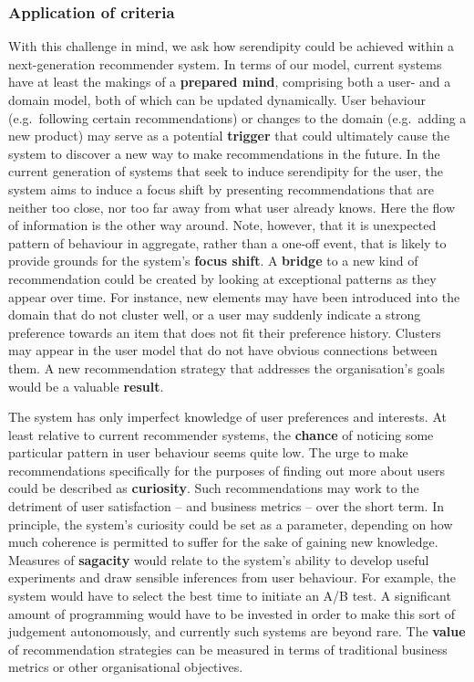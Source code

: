 \subsubsection{Application of criteria}

With this challenge in mind, we ask how serendipity could be achieved
within a next-generation recommender system. In terms of our model,
current systems have at least the makings of a \textbf{prepared mind},
comprising both a user- and a domain model, both of which can be
updated dynamically.  User behaviour (e.g.~following certain
recommendations) or changes to the domain (e.g.~adding a new product)
may serve as a potential \textbf{trigger} that could ultimately cause
the system to discover a new way to make recommendations in the
future.  In the current generation of systems that seek to induce
serendipity for the user, the system aims to induce a focus shift by
presenting recommendations that are neither too close, nor too far
away from what user already knows.  Here the flow of information is
the other way around.  Note, however, that it is unexpected pattern of
behaviour in aggregate, rather than a one-off event, that is likely to
provide grounds for the system's \textbf{focus shift}.  A
\textbf{bridge} to a new kind of recommendation could be created by
looking at exceptional patterns as they appear over time.  For
instance, new elements may have been introduced into the domain that
do not cluster well, or a user may suddenly indicate a strong
preference towards an item that does not fit their preference history.
Clusters may appear in the user model that do not have obvious
connections between them.  A new recommendation strategy that
addresses the organisation's goals would be a valuable
\textbf{result}.

The system has only imperfect knowledge of user preferences and
interests.  At least relative to current recommender systems, the
\textbf{chance} of noticing some particular pattern in user behaviour
seems quite low.  The urge to make recommendations specifically for
the purposes of finding out more about users could be described as
\textbf{curiosity}.  Such recommendations may work to the detriment of
user satisfaction -- and business metrics -- over the short term.  In
principle, the system's curiosity could be set as a parameter,
depending on how much coherence is permitted to suffer for the sake of
gaining new knowledge.  Measures of \textbf{sagacity} would relate to
the system's ability to develop useful experiments and draw sensible
inferences from user behaviour.  For example, the system would have to
select the best time to initiate an A/B test.  A significant amount of
programming would have to be invested in order to make this sort of
judgement autonomously, and currently such systems are beyond rare.
The \textbf{value} of recommendation strategies can be measured in
terms of traditional business metrics or other organisational
objectives.

